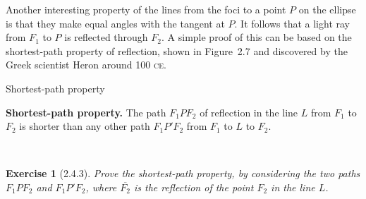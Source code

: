 \documentclass[12pt]{article}
\newcommand{\XB}{\color{black}}
\newcommand{\XBB}{\color{blue}}
\theoremstyle{plain}
\newtheorem{ex}{Exercise}
\begin{document}
\newpage

Another interesting property of the lines from the foci to a point $P$ on the ellipse is that they make equal angles with the tangent at $P$. It follows that a light ray from $F_1$ to $P$ is reflected through $F_2$. A simple proof of this can be based on the shortest-path property of reflection, shown in Figure~2.7 and discovered by the Greek scientist Heron around 100 \textsc{ce}.

\begin{center}

  Shortest-path property
\end{center}

\vfill 

\textbf{Shortest-path property.} The path $F_1PF_2$ of reflection in the line $L$ from $F_1$ to $F_2$ is shorter than any other path $F_1P'F_2$ from $F_1$ to $L$ to $F_2$.

\newpage
\XBB\hrulefill\XB \\
\begin{ex} [2.4.3]
  Prove the shortest-path property, by considering the two paths $F_1PF_2$ and $F_1P'F_2$, where $\overline{F_2}$ is the reflection of the point $F_2$ in the line $L$.
\end{ex}
\XBB\hrulefill\XB \\
\end{document}
